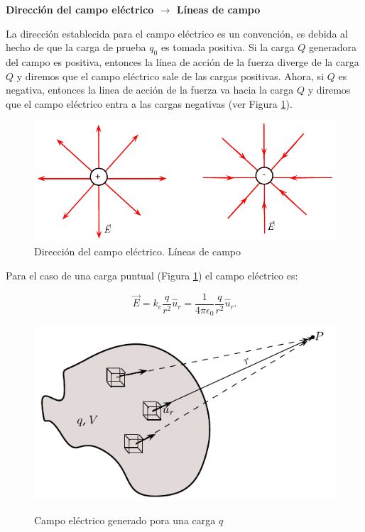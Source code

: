 \vspace{0.5cm}

\textbf{Dirección del campo eléctrico $\rightarrow$ Líneas de campo}

\vspace{0.5cm}

La dirección establecida para el campo eléctrico es un convención, es debida al hecho de que la carga de prueba $q_0$ es tomada positiva. Si la carga $Q$ generadora del campo es positiva, entonces la línea de  acción de la fuerza diverge de la carga $Q$ y diremos que el campo eléctrico sale de las cargas positivas. Ahora, si $Q$ es negativa, entonces la linea de acción de la fuerza va hacia la carga $Q$ y diremos que el campo eléctrico entra a las cargas negativas (ver Figura \ref{direcciondelE}).

\begin{figure}[h]
\begin{center}
\includegraphics[scale=0.8]{electrostatica/direcciondelcampoelectrico}
\end{center}
\caption{Dirección del campo eléctrico. Líneas de campo}
\label{direcciondelE}
\end{figure}

Para el caso de una carga puntual (Figura \ref{direcciondelE}) el campo eléctrico es:

\begin{equation}
\vec{E}=k_e \dfrac{q}{r^2} \hat{u}_r= \dfrac{1}{4\pi \epsilon_0} \dfrac{q}{r^2} \hat{u}_r .
\end{equation}

\begin{figure}
\begin{center}
\includegraphics[scale=0.9]{electrostatica/campoelectricocontinuo}
\label{figcontinuo}
\end{center}
\caption{Campo eléctrico generado pora una carga $q$}
\label{campoelectricocontinuo}
\end{figure}

